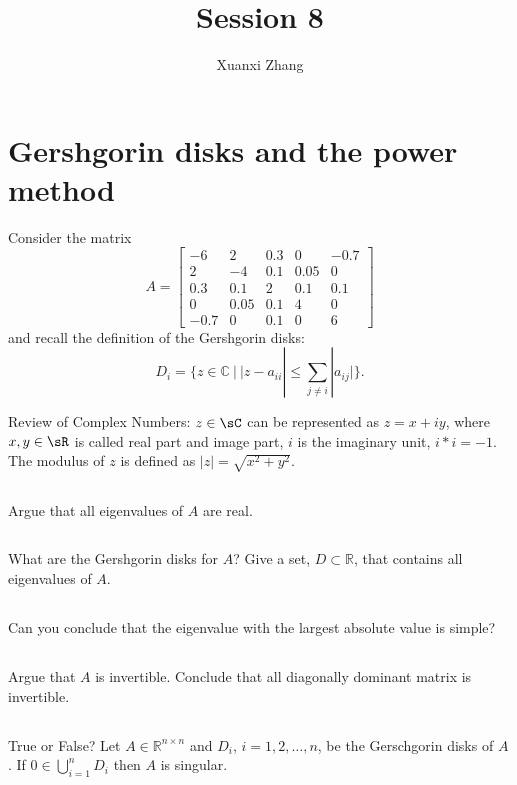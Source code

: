 \documentclass{article}%
\title{\huge Session 8\\
\normalsize}
\author{Xuanxi Zhang}
\begin{document}
\maketitle



\section{Gershgorin disks and the power method}

Consider the matrix 
$$
A = \begin{bmatrix}
- 6 & 2 & 0.3 & 0 & -0.7 \\
2 & - 4 & 0.1 & 0.05 & 0 \\
0.3 & 0.1 & 2 & 0.1 & 0.1 \\
0 & 0.05 & 0.1 &  4 & 0 \\
-0.7 & 0 & 0.1  & 0  & 6
\end{bmatrix}
$$
and recall the definition of the Gershgorin disks:
\[
D_i = \{ z \in \mathbb C ~|~ |z - a_{ii}| \le \sum_{j \ne i} |a_{ij}| \}.
\]

Review of Complex Numbers: 
$z\in\sC$ can be represented as $z=x+iy$, where $x,y\in\sR$ is called real part and image part, $i$ is the imaginary unit, $i*i=-1$. The modulus of $z$ is defined as $|z|=\sqrt{x^2+y^2}$.

\subsection{}
Argue that all eigenvalues of $A$ are real.

\subsection{}
What are the Gershgorin disks for $A$?  Give a set, $D \subset \mathbb{R}$, that contains all eigenvalues of $A$.

\subsection{}
Can you conclude that the eigenvalue with the largest absolute value is simple?

\subsection{}
Argue that $A$ is invertible. Conclude that all diagonally dominant matrix is invertible.

\subsection{}
True or False? Let $A \in \mathbb{R}^{n \times n}$ and $D_i$, $i
  = 1,2,\dots,n$, be the Gerschgorin disks of $A$. If $0 \in
  \bigcup_{i=1}^n D_i$ then $A$ is singular.
  
\end{document}
